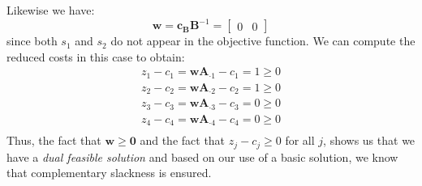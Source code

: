\begin{example}
Likewise we have:
\begin{displaymath}
\mathbf{w} = \mathbf{c}_\mathbf{B}\mathbf{B}^{-1} = \begin{bmatrix}0&0\end{bmatrix}
\end{displaymath}
since both $s_1$ and $s_2$ do not appear in the objective function. 
We can compute the reduced costs in this case to obtain:
\begin{gather*}
z_1 - c_1 = \mathbf{w}\mathbf{A}_{\cdot 1} - c_1 = 1 \geq 0\\
z_2 - c_2 = \mathbf{w}\mathbf{A}_{\cdot 2} - c_2 = 1 \geq 0\\
z_3 - c_3 = \mathbf{w}\mathbf{A}_{\cdot 3} - c_3 = 0 \geq 0\\
z_4 - c_4 = \mathbf{w}\mathbf{A}_{\cdot 4} - c_4 = 0 \geq 0\\
\end{gather*}
Thus, the fact that $\mathbf{w} \geq \mathbf{0}$ and the fact that $z_j - c_j \geq 0$ for all $j$, shows us that we have a \textit{dual feasible solution} and based on our use of a basic solution, we know that complementary slackness is ensured. 


\end{example}
